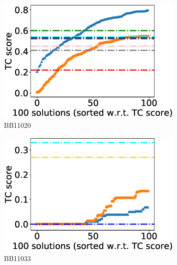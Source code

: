 \begin{figure}[!htbp]
\begin{adjustwidth}{-1cm}{-1cm}
		\begin{subfigure}[b]{0.26\textwidth}
			\includegraphics[width=\columnwidth]{Figure/summary/precomputedInit/Balibase/BB11020_tc_density_single_run_2}
			\caption{BB11020}
\end{subfigure}
\begin{subfigure}[b]{0.26\textwidth}
			\includegraphics[width=\columnwidth]{Figure/summary/precomputedInit/Balibase/BB11033_tc_density_single_run_2}
			\caption{BB11033}
\end{subfigure}
		\begin{subfigure}{0.26\textwidth}

\end{subfigure}
\end{adjustwidth}
\end{figure}
